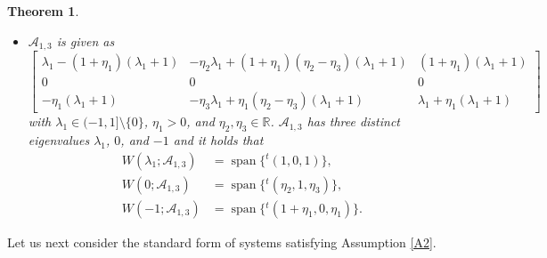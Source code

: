 \documentclass[11pt,a4paper,twosides]{amsart}
\theoremstyle{plain}
\newtheorem{theorem}{Theorem}[section]
\theoremstyle{remark}
\numberwithin{equation}{section}
\newcommand{\R}{\mathbb{R}}
\DeclareMathOperator{\Span}{span}
\theoremstyle{definition}
\newcommand{\1}{{\bf 1}_{\{|x| < |t|\}}}
\renewcommand{\tilde}{\widetilde}
\begin{document}
\begin{theorem}
\begin{itemize}
 $1$ and $\lambda$ and it holds that
 \begin{align*}
	W(1;\mathscr{A}_{1,2}) 
	&=\begin{cases}
	 \Span \{{}^t\!(1,0,1) \}, & \eta_4 \neq0,\\
	 \Span \{{}^t\!(1,0,1), {}^t\!(\eta_2,1,\eta_3)\}, & \eta_4=0,
	 \end{cases}
	 \\
	\tilde{W}(1;\mathscr{A}_{1,2}) 
	&= \Span \{{}^t\!(1,0,1), {}^t\!(\eta_2,1,\eta_3) \}, \\
	W(\lambda;\mathscr{A}_{1,2}) 
	&= \Span \{{}^t\!(1+\eta_1,0,\eta_1) \}.
\end{align*}
\item $\mathscr{A}_{1,3}$ is given as
\[
\begin{bmatrix}
	\lambda_1 - (1+\eta_1)(\lambda_1+1) & 
	-\eta_2\lambda_1 +(1+\eta_1)(\eta_2-\eta_3)(\lambda_1+1) 
	& (1+\eta_1)(\lambda_1+1) \\
	0 & 0 & 0\\
	-\eta_1(\lambda_1+1) & -\eta_3 \lambda_1 +\eta_1(\eta_2-\eta_3)(\lambda_1+1)& \lambda_1 +\eta_1(\lambda_ 1+1)
	\end{bmatrix}
\]
with $\lambda_1 \in (-1,1] \setminus\{0\}$, $\eta_1>0$, and $\eta_2,\eta_3\in\R$. 
$\mathscr{A}_{1,3}$ has three distinct eigenvalues $\lambda_1$, $0$, and $-1$ and it holds that
\begin{align*}
	W(\lambda_1;\mathscr{A}_{1,3}) 
	&= \Span \{{}^t\!(1,0,1) \}, \\
	W(0;\mathscr{A}_{1,3}) 
	&= \Span \{{}^t\!(\eta_2,1,\eta_3) \}, \\
	W(-1;\mathscr{A}_{1,3}) 
	&= \Span \{{}^t\!(1+\eta_1,0,\eta_1) \}.
\end{align*}
\end{itemize}
\end{theorem}
Let us next consider the standard form of systems satisfying Assumption \ref{A2}.
\end{document}
